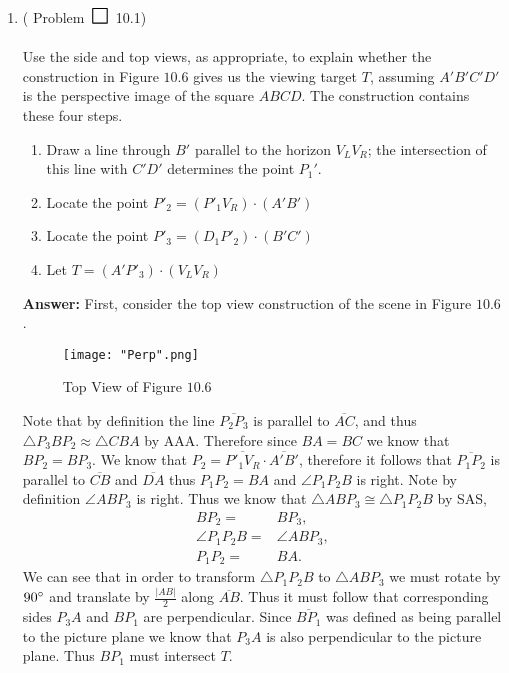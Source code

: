 \documentclass[12pt]{amsart}
\def\msquare{\mathord{\scalerel*{\Box}{gX}}}
\theoremstyle{remark}
\theoremstyle{mycomment}
\begin{document}
\thispagestyle{fancy}

\begin{enumerate}

\item( Problem $\msquare$ 10.1)\\
\\
 Use the side and top views, as appropriate, to explain whether the construction in Figure $10.6$ gives us the viewing target $T$, assuming $A'B'C'D'$ is the perspective image of the square $ABCD$. The construction contains these four steps.\\
\begin{enumerate}
\item Draw a line through $B'$ parallel to the horizon $V_LV_R$; the intersection of this line with $C'D'$ determines the point $P_1'$.\\
\item Locate the point $P'_2 = (P'_1V_R)\cdot(A'B')$\\

\item Locate the point $P'_3 = (D_1P'_2)\cdot(B'C')$\\

\item Let $T =  (A'P'_3)\cdot(V_LV_R)$\\
\end{enumerate}

\textbf{Answer:} First, consider the top view construction of the scene in Figure $10.6$.
\begin{figure}[H]
\caption{Top View of Figure $10.6$}
\centering
\texttt{[image: "Perp".png]}
\end{figure}



 Note that by definition the line $\overline{P_2P_3}$ is parallel to $\overline{AC}$, and thus $\triangle P_3BP_2 \approx \triangle CBA$ by AAA. Therefore since $BA = BC$ we know that $BP_2 = BP_3$. We know that $P_2 = \overline{P'_1V_R} \cdot \overline{A'B'}$, therefore it follows that $\overline{P_1P_2}$ is parallel to $\overline{CB}$ and $\overline{DA}$ thus $P_1P_2 = BA$ and $\angle P_1P_2B$ is right. Note by definition $\angle ABP_3$ is right.
Thus we know that $\triangle ABP_3 \cong \triangle P_1P_2B$ by SAS,
\begin{align*}
BP_2 =& BP_3,\\
\angle P_1P_2B =& \angle ABP_3,\\
P_1P_2 =& BA.
\end{align*}
 We can see that in order to transform $\triangle P_1P_2B$ to $\triangle ABP_3$ we must rotate by $90\degree$ and translate by $\frac{|AB|}{2}$ along $\overline{AB}$. Thus it must follow that corresponding sides $P_3A$ and $BP_1$ are perpendicular. Since $\overline{BP_1}$ was defined as being parallel to the picture plane we know that $P_3A$ is also perpendicular to the picture plane. Thus $BP_1$ must intersect $T$.








\end{enumerate}
\end{document}
